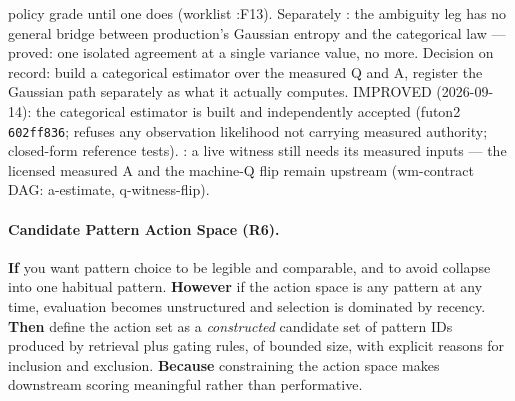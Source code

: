 {policy grade until one does (worklist :F13). Separately : the ambiguity leg has no
general bridge between production's Gaussian entropy and the categorical
law --- proved: one isolated agreement at a single variance value, no
more. Decision on record: build a categorical estimator over the measured
Q and A, register the Gaussian path separately as what it actually
computes. IMPROVED (2026-09-14): the categorical estimator is built
and independently accepted (futon2 \texttt{602ff836}; refuses any
observation likelihood not carrying measured authority; closed-form
reference tests). : a live witness still needs its
measured inputs --- the licensed measured A and the machine-Q flip
remain upstream (wm-contract DAG: a-estimate, q-witness-flip).}

\hypertarget{pat-r6}{}\paragraph{Candidate Pattern Action Space (R6).}\label{pat:r6} \textbf{If} you want pattern choice to be legible and comparable, and to avoid collapse into one habitual pattern. \textbf{However} if the action space is any pattern at any time, evaluation becomes unstructured and selection is dominated by recency. \textbf{Then} define the action set as a \emph{constructed} candidate set of pattern IDs produced by retrieval plus gating rules, of bounded size, with explicit reasons for inclusion and exclusion. \textbf{Because} constraining the action space makes downstream scoring meaningful rather than performative.

